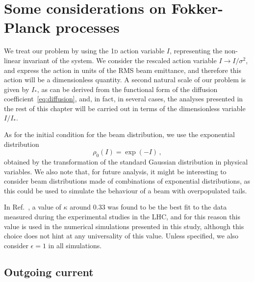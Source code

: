 {%
\section{Some considerations on Fokker-Planck processes}\label{sec:some_considerations}

We treat our problem by using the 1\textsc{d} action variable $I$, representing the non-linear invariant of the system. We consider the rescaled action variable $I \to I/\sigma^2$, and express the action in units of {the RMS} beam emittance, and therefore this action will be a dimensionless quantity. {A second natural scale of our problem is given by $I_\ast$, as can be derived from the functional form of the diffusion coefficient~\eqref{eq:diffusion}, and, in fact, in several cases, the analyses presented in the rest of this chapter will be carried out in terms of the dimensionless variable $I/I_\ast$.}

As for the initial condition for the beam distribution, we use the exponential distribution
\begin{equation}
    \rho_0(I) = \exp(-I) \, , 
    \label{eq:initial_distribution}
\end{equation}
obtained by the transformation of the standard Gaussian distribution in physical variables. We also note that, for future analysis, it might be interesting to consider beam distributions made of combinations of exponential distributions, as this could be used to simulate the behaviour of a beam with overpopulated tails.

In Ref.~\cite{bazzani2020diffusion}, a value of $\kappa$ around $0.33$ was found to be the best fit to the data measured during the experimental studies in the LHC, and for this reason this value is used in the numerical simulations presented in this study, {although this choice does not hint at any universality of this value.} Unless specified, we also consider $\epsilon=1$ in all simulations.

\subsection{Outgoing current}\label{subsec:outgoing_current}


}
